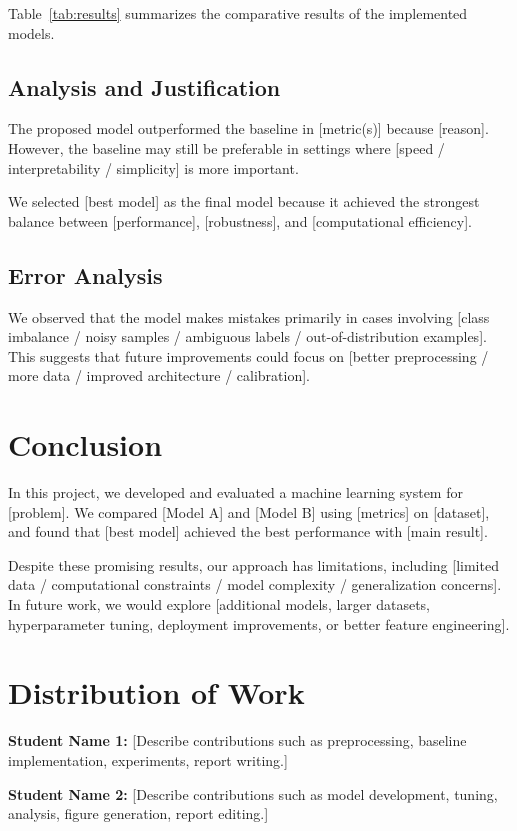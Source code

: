 \documentclass{article}
\begin{document}
Table~\ref{tab:results} summarizes the comparative results of the implemented models.

\subsection{Analysis and Justification}
The proposed model outperformed the baseline in [metric(s)] because [reason]. However, the baseline may still be preferable in settings where [speed / interpretability / simplicity] is more important.

We selected [best model] as the final model because it achieved the strongest balance between [performance], [robustness], and [computational efficiency].

\subsection{Error Analysis}
We observed that the model makes mistakes primarily in cases involving [class imbalance / noisy samples / ambiguous labels / out-of-distribution examples]. This suggests that future improvements could focus on [better preprocessing / more data / improved architecture / calibration].

\section{Conclusion}
In this project, we developed and evaluated a machine learning system for [problem]. We compared [Model A] and [Model B] using [metrics] on [dataset], and found that [best model] achieved the best performance with [main result].

Despite these promising results, our approach has limitations, including [limited data / computational constraints / model complexity / generalization concerns]. In future work, we would explore [additional models, larger datasets, hyperparameter tuning, deployment improvements, or better feature engineering].

\section*{Distribution of Work}
\textbf{Student Name 1:} [Describe contributions such as preprocessing, baseline implementation, experiments, report writing.]

\textbf{Student Name 2:} [Describe contributions such as model development, tuning, analysis, figure generation, report editing.]




\end{document}
